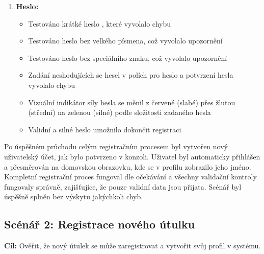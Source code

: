 \documentclass[czech, bp, kiv, he, iso690numb, pdf]{fasthesis}
\begin{document}
\begin{enumerate}
        \item \textbf{Heslo:}
        \begin{itemize}
            \item Testováno krátké heslo , které vyvolalo chybu 
            \item Testováno heslo bez velkého písmena, což vyvolalo upozornění 
            \item Testováno heslo bez speciálního znaku, což vyvolalo upozornění 
            \item Zadání neshodujících se hesel v polích pro heslo a potvrzení hesla vyvolalo chybu 
            \item Vizuální indikátor síly hesla se měnil z červené (slabé) přes žlutou (střední) na zelenou (silné) podle složitosti zadaného hesla
            \item Validní a silné heslo umožnilo dokončit registraci
        \end{itemize}
    \end{enumerate}

    Po úspěšném průchodu celým registračním procesem byl vytvořen nový uživatelský účet, jak bylo potvrzeno v  konzoli. Uživatel byl automaticky přihlášen a přesměrován na domovskou obrazovku, kde se v profilu zobrazilo jeho jméno. Kompletní registrační proces fungoval dle očekávání a všechny validační kontroly fungovaly správně, zajišťujíce, že pouze validní data jsou přijata. Scénář byl úspěšně splněn bez výskytu jakýchkoli chyb.


    \subsection*{Scénář 2: Registrace nového útulku}

    \textbf{Cíl:} Ověřit, že nový útulek se může zaregistrovat a vytvořit svůj profil v systému.\\
\end{document}
